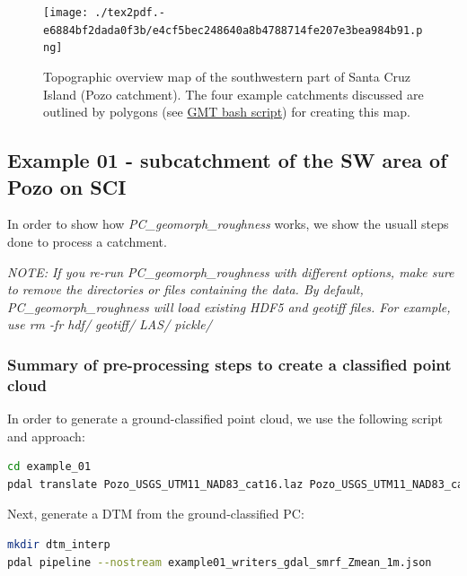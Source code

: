 \documentclass[a4paperpaper,,tablecaptionabove]{scrartcl}
\begin{document}
\begin{figure}
\centering
\texttt{[image: ./tex2pdf.-e6884bf2dada0f3b/e4cf5bec248640a8b4788714fe207e3bea984b91.png]}
\caption{Topographic overview map of the southwestern part of Santa Cruz
Island (Pozo catchment). The four example catchments discussed are
outlined by polygons (see
\href{https://github.com/BodoBookhagen/PC_geomorph_roughness/blob/master/example_01/plot_GMT_Pozo_4catchments_overview.sh}{GMT
bash script}) for creating this map.\label{Fig:Pozo_DEM_examples_map}}
\end{figure}

\hypertarget{example-01---subcatchment-of-the-sw-area-of-pozo-on-sci}{%
\subsection{Example 01 - subcatchment of the SW area of Pozo on
SCI}\label{example-01---subcatchment-of-the-sw-area-of-pozo-on-sci}}

In order to show how \emph{PC\_geomorph\_roughness} works, we show the
usuall steps done to process a catchment.

\emph{NOTE: If you re-run PC\_geomorph\_roughness with different
options, make sure to remove the directories or files containing the
data. By default, PC\_geomorph\_roughness will load existing HDF5 and
geotiff files. For example, use rm -fr hdf/ geotiff/ LAS/ pickle/ }

\hypertarget{summary-of-pre-processing-steps-to-create-a-classified-point-cloud}{%
\subsubsection{Summary of pre-processing steps to create a classified
point
cloud}\label{summary-of-pre-processing-steps-to-create-a-classified-point-cloud}}

In order to generate a ground-classified point cloud, we use the
following script and approach:

\begin{lstlisting}[language=bash]
cd example_01
pdal translate Pozo_USGS_UTM11_NAD83_cat16.laz Pozo_USGS_UTM11_NAD83_cat16_SMRF_cl2.las --json example01_PDAL_SMRF_pipeline.json
\end{lstlisting}

Next, generate a DTM from the ground-classified PC:

\begin{lstlisting}[language=bash]
mkdir dtm_interp
pdal pipeline --nostream example01_writers_gdal_smrf_Zmean_1m.json
\end{lstlisting}
\end{document}
